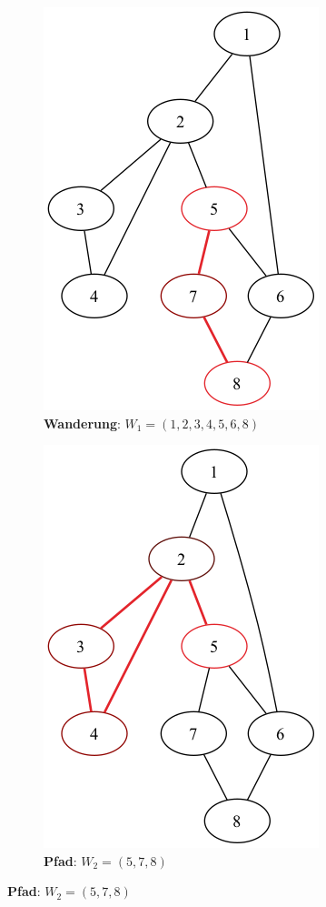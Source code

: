 \documentclass[a4paper,11pt]{report}
\begin{document}
\newpage

\begin{figure}[htbp]
    \centering
    \begin{subfigure}[b]{0.45\textwidth}
        \includegraphics[height=0.25\textheight]{notebook/assets/aufgabe_03_walk_1.png}
        \caption{\textbf{Wanderung}: $W_1 = (1, 2, 3, 4, 5, 6, 8)$}
        \label{fig:w_1}
    \end{subfigure}
    \hfill
    \begin{subfigure}[b]{0.45\textwidth}
        \includegraphics[height=0.25\textheight]{notebook/assets/aufgabe_03_walk_2.png}
        \caption{\textbf{Pfad}: $W_2 = (5, 7, 8)$}
        \label{fig:w_2}
    \end{subfigure}
    \hfill


\end{figure}
\end{document}
